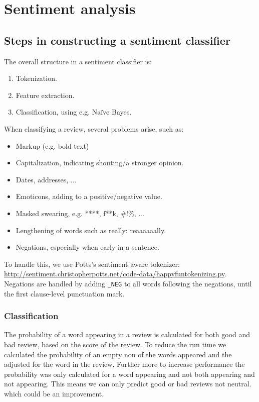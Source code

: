 \section{Sentiment analysis}

\subsection{Steps in constructing a sentiment classifier}
The overall structure in a sentiment classifier is:
\begin{enumerate}
    \item Tokenization.
    \item Feature extraction.
    \item Classification, using e.g. Naïve Bayes.
\end{enumerate}
%
When classifying a review, several problems arise, such as:
\begin{itemize}
    \item Markup (e.g. bold text)
    \item Capitalization, indicating shouting/a stronger opinion.
    \item Dates, addresses, ...
    \item Emoticons, adding to a positive/negative value.
    \item Masked swearing, e.g. ****, f**k, \@\#!\%, ...
    \item Lengthening of words such as really: reaaaaaally.
    \item Negations, especially when early in a sentence.
\end{itemize}

To handle this, we use Potts's sentiment aware tokenizer: \url{http://sentiment.christopherpotts.net/code-data/happyfuntokenizing.py}. Negations are handled by adding \texttt{\_NEG} to all words following the negations, until the first clause-level punctuation mark.

\subsubsection{Classification}
The probability of a word appearing in a review is calculated for both good and bad review, based on the score of the review. To reduce the run time we calculated the probability of an empty non of the words appeared and the adjusted for the word in the review. Further more to increase performance the probability was only calculated for a word appearing and not both appearing and not appearing. This means we can only predict good or bad reviews not neutral. which could be an improvement.


